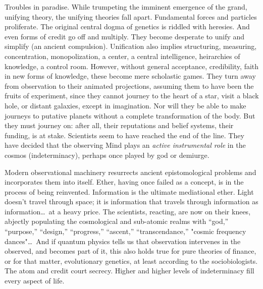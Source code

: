 Troubles in paradise. While trumpeting the imminent emergence of the grand, unifying theory, the
unifying theories fall apart. Fundamental forces and particles proliferate. The original central
dogma of genetics is riddled with heresies. And even forms of credit go off and multiply. They
become desperate to unify and simplify (an ancient compulsion). Unification also implies
structuring, measuring, concentration, monopolization, a center, a central intelligence, heirarchies
of knowledge, a control room. However, without general acceptance, credibility, faith in new forms
of knowledge, these become mere scholastic games. They turn away from observation to their animated
projections, assuming them to have been the fruits of experiment, since they cannot journey to the
heart of a star, visit a black hole, or distant galaxies, except in imagination. Nor will they be
able to make journeys to putative planets without a complete transformation of the body. But they
must journey on: after all, their reputations and belief systems, their funding, is at stake.
Scientists seem to have reached the end of the line. They have decided that the observing Mind plays
an \emph{active instrumental role} in the cosmos (indeterminacy), perhaps once played by god or
demiurge. 

Modern observational machinery resurrects ancient epistomological problems and incorporates them
into itself. Ether, having once failed as a concept, is in the process of being reinvented.
Information is the ultimate mediational ether. Light doesn't travel through space; it is information
that travels through information as information\ldots\ at a heavy price. The scientists, reacting,
are now on their knees, abjectly populating the cosmological and sub-atomic realms with
\enquote{god,} \enquote{purpose,} \enquote{design,} \enquote{progress,} \enquote{ascent,}
\enquote{transcendance,} "cosmic frequency dances"\ldots\ And if quantum physics tells us that
observation intervenes in the observed, and becomes part of it, this also holds true for pure
theories of finance, or for that matter, evolutionary genetics, at least according to the
sociobiologists. The atom and credit court secrecy. Higher and higher levels of indeterminacy fill
every aspect of life. 

